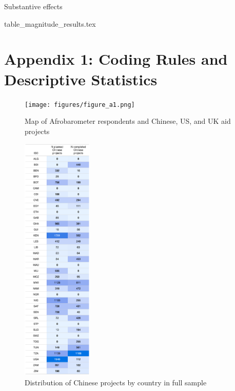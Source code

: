 \documentclass[9pt]{article}
\begin{document}
\setlength{\tabcolsep}{5pt}
\begin{table}[H]
\caption{Substantive effects}
\label{reg}
\centering
{table_magnitude_results.tex}
\end{table}

\renewcommand\thefigure{A\arabic{figure}}    
\renewcommand\thetable{A\arabic{table}}    

\setcounter{figure}{0} 
\setcounter{table}{0} 

\newpage
\appendix
\section{Appendix 1: Coding Rules and Descriptive Statistics}

\begin{figure}[H]
\centering
\texttt{[image: figures/figure\_a1.png]}
\caption{Map of Afrobarometer respondents and Chinese, US, and UK aid projects}
\end{figure}

\begin{figure}[H]
\centering
\includegraphics[width=0.3\textwidth]{figures/figure_a2.png}
\caption{Distribution of Chinese projects by country in full sample}
\end{figure}
\end{document}
